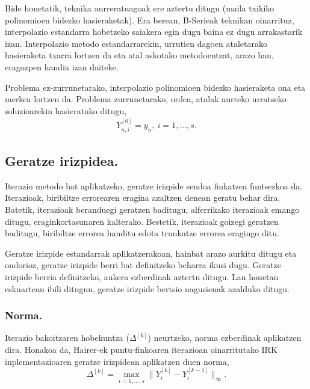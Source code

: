 \begin{enumerate}
Bide honetatik, teknika aurreratuagoak ere aztertu ditugu (maila txikiko polinomioen bidezko hasieraketak). Era berean, B-Serieak \cite{Chartier2010} teknikan oinarrituz, interpolazio estandarra \cite{Laburta1998} hobetzeko saiakera egin dugu baina ez dugu arrakastarik izan. Interpolazio metodo estandarrarekin, urrutien dagoen ataletarako hasieraketa txarra lortzen da eta atal askotako metodoentzat, arazo hau, eragozpen handia izan daiteke.  

\end{enumerate}

Problema ez-zurrunetarako, interpolazio polinomioen bidezko hasieraketa ona eta merkea lortzen da. Problema zurrunetarako, ordea, atalak aurreko urratseko soluzioarekin hasieratuko ditugu,
\begin{align*}
Y_{n,i}^{[0]}=y_n, \ i=1,\dots,s.  
\end{align*}
    

\subsection*{Geratze irizpidea.}

Iterazio metodo bat aplikatzeko, geratze irizpide sendoa finkatzea funtsezkoa da.  Iterazioak, biribiltze errorearen eragina azaltzen denean geratu behar dira. Batetik, iterazioak beranduegi geratzen baditugu, alferrikako iterazioak emango ditugu, eraginkortasunaren kalterako. Bestetik, iterazioak goizegi geratzen baditugu, biribiltze errorea handitu edota trunkatze errorea eragingo ditu.  

Geratze irizpide estandarrak aplikatzerakoan, hainbat arazo aurkitu ditugu eta ondorioz, geratze irizpide berri bat definitzeko beharra ikusi dugu. Geratze irizpide berria definitzeko, aukera ezberdinak aztertu ditugu. Lan honetan eskuartean ibili ditugun, geratze irizpide bertsio nagusienak azalduko ditugu.      

\subsubsection*{Norma.}
Iterazio bakoitzaren hobekuntza ($\Delta^{[k]}$) neurtzeko, norma ezberdinak aplikatzen dira. Honakoa da, Hairer-ek puntu-finkoaren iterazioan oinarritutako IRK inplementazioaren geratze irizpidean aplikatzen duen norma,
\begin{equation*}
\Delta^{[k]}= \max_{i=1,\dots,s} \|Y_i^{[k]}-Y_i^{[k-1]}\|_{\infty}.
\end{equation*}

